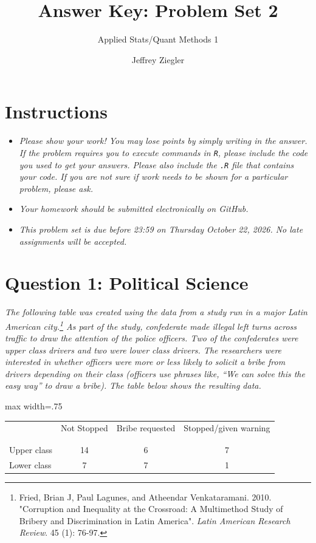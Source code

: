 \documentclass[12pt,letterpaper]{article}
\title{Answer Key: Problem Set 2}
\date{Jeffrey Ziegler}
\author{Applied Stats/Quant Methods 1}
\begin{document}
	\maketitle
	
	\section*{Instructions}
	\begin{itemize}
	\item \textit{Please show your work! You may lose points by simply writing in the answer. If the problem requires you to execute commands in \texttt{R}, please include the code you used to get your answers. Please also include the \texttt{.R} file that contains your code. If you are not sure if work needs to be shown for a particular problem, please ask.}
	\item \textit{Your homework should be submitted electronically on GitHub.}
	\item \textit{This problem set is due before 23:59 on Thursday October 22, 2026. No late assignments will be accepted.}
	\end{itemize}
	
	\vspace{.5cm}
	\section*{Question 1: Political Science}
		\vspace{.25cm}
\textit{The following table was created using the data from a study run in a major Latin American city.\footnote{Fried, Brian J, Paul Lagunes, and Atheendar Venkataramani. 2010. "Corruption and Inequality at the Crossroad: A Multimethod Study of Bribery and Discrimination in Latin America". \textit{Latin American Research Review}. 45 (1): 76-97.} As part of the study, confederate made illegal left turns across traffic to draw the attention of the police officers.  Two of the confederates were upper class drivers and two were lower class drivers.  The researchers were interested in whether officers were more or less likely to solicit a bribe from drivers depending on their class (officers use phrases like, ``We can solve this the easy way'' to draw a bribe).  The table below shows the resulting data.}

\begin{table}[h!]
	\centering
	\begin{adjustbox}{max width=.75\textwidth}
		\begin{tabular}{l | c c c }
			& Not Stopped & Bribe requested & Stopped/given warning \\
			\\[-1.8ex] 
			\hline \\[-1.8ex]
			Upper class & 14 & 6 & 7 \\
			Lower class & 7 & 7 & 1 \\
			\hline
		\end{tabular}
	\end{adjustbox}
\end{table}
\end{document}
